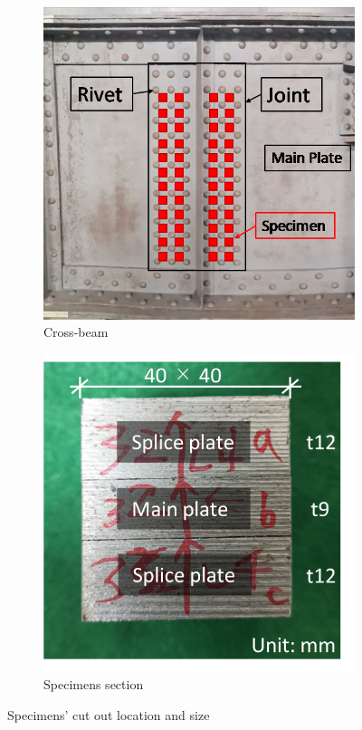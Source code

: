 \begin{figure}
    \centering
    \begin{subfigure}[t]{0.48\textwidth}
    \includegraphics[width=\linewidth]{imgs/ch3/fig7a.png}
    \caption{Cross-beam}
    \label{ch3fig7a}  
    \end{subfigure}
    \hfill
    \begin{subfigure}[t]{0.48\textwidth}
    \includegraphics[width=\linewidth]{imgs/ch3/fig7b.png}
    \caption{Specimens section}
    \label{ch3fig7b}  
    \end{subfigure}
    \caption{Specimens' cut out location and size}
\end{figure}

